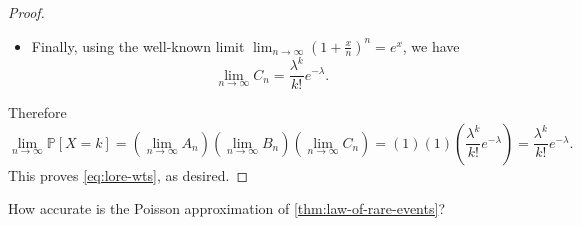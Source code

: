 \documentclass[10pt]{article}
\theoremstyle{definition}
\newcommand{\1}[1]{\textbf{1}_{\left[#1\right]}} %
\def\P{\mathbb{P}} %
\begin{document}
\begin{proof}
\begin{itemize}
    \item Finally, using the well-known limit
    $\lim_{n\to\infty} \left( 1+\frac{x}{n} \right) ^{n}=e^{x}$, we have
    \begin{equation*}
      \lim_{n\to\infty} C_{n} = \frac{\lambda^{k}}{k!}e^{-\lambda}.
    \end{equation*}
  \end{itemize}
  Therefore
  \begin{equation*}
    \lim_{n\to\infty} \P \left[ X=k \right] =\left( \lim_{n\to\infty}  A_{n} \right) \left( \lim_{n\to\infty} B_{n} \right) \left( \lim_{n\to\infty} C_{n} \right) = (1)(1) \left( \frac{\lambda^{k}}{k!}e^{-\lambda} \right) =   \frac{\lambda^{k}}{k!}e^{-\lambda}.
  \end{equation*}
  This proves \cref{eq:lore-wts}, as desired.  
\end{proof}


How accurate is the Poisson approximation of \cref{thm:law-of-rare-events}?
\end{document}
